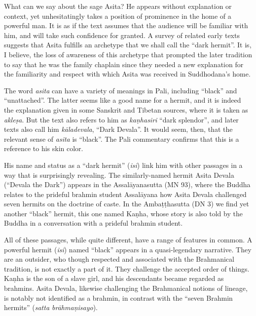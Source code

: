 \documentclass[12pt,openany]{book}%
\begin{document}
What can we say about the sage Asita? He appears without explanation or context, yet unhesitatingly takes a position of prominence in the home of a powerful man. It is as if the text assumes that the audience will be familiar with him, and will take such confidence for granted. A survey of related early texts suggests that Asita fulfills an archetype that we shall call the “dark hermit”. It is, I believe, the loss of awareness of this archetype that prompted the later tradition to say that he was the family chaplain since they needed a new explanation for the familiarity and respect with which Asita was received in Suddhodana’s home.

The word \textit{asita} can have a variety of meanings in Pali, including “black” and “unattached”. The latter seems like a good name for a hermit, and it is indeed the explanation given in some Sanskrit and Tibetan sources, where it is taken as \textit{\textsanskrit{akleṣa}}. But the text also refers to him as \textit{\textsanskrit{kaṇhasiri}} “dark splendor”, and later texts also call him \textit{\textsanskrit{kāladevala}}, “Dark Devala”. It would seem, then, that the relevant sense of \textit{asita} is “black”. The Pali commentary confirms that this is a reference to his skin color.

His name and status as a “dark hermit” (\textit{isi}) link him with other passages in a way that is surprisingly revealing. The similarly-named hermit Asita Devala (“Devala the Dark”) appears in the \textsanskrit{Assalāyanasutta} (MN 93), where the Buddha relates to the prideful brahmin student \textsanskrit{Assalāyana} how Asita Devala challenged seven hermits on the doctrine of caste. In the \textsanskrit{Ambaṭṭhasutta} (DN 3) we find yet another “black” hermit, this one named \textsanskrit{Kaṇha}, whose story is also told by the Buddha in a conversation with a prideful brahmin student.

All of these passages, while quite different, have a range of features in common. A powerful hermit (\textit{isi}) named “black” appears in a quasi-legendary narrative. They are an outsider, who though respected and associated with the Brahmanical tradition, is not exactly a part of it. They challenge the accepted order of things. \textsanskrit{Kaṇha} is the son of a slave girl, and his descendants became regarded as brahmins. Asita Devala, likewise challenging the Brahmanical notions of lineage, is notably not identified as a brahmin, in contrast with the “seven Brahmin hermits” (\textit{satta \textsanskrit{brāhmaṇisayo}}).
\end{document}
